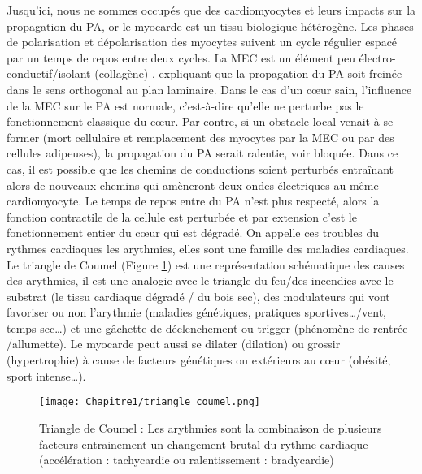 \clearpage

Jusqu’ici, nous ne sommes occupés que des cardiomyocytes et leurs impacts sur la propagation du PA, or le myocarde est un tissu biologique hétérogène. Les phases de polarisation et dépolarisation des myocytes suivent un cycle régulier espacé par un temps de repos entre deux cycles. La MEC est un élément peu électro-conductif/isolant (collagène) \cite{Zannad2005}, expliquant que la propagation du PA soit freinée dans le sens orthogonal au plan laminaire. Dans le cas d’un cœur sain, l’influence de la MEC sur le PA est normale, c’est-à-dire qu’elle ne perturbe pas le fonctionnement classique du cœur. Par contre, si un obstacle local venait à se former (mort cellulaire et remplacement des myocytes par la MEC ou par des cellules adipeuses), la propagation du PA serait ralentie, voir bloquée. Dans ce cas, il est possible que les chemins de conductions soient perturbés entraînant alors de nouveaux chemins qui amèneront deux ondes électriques au même cardiomyocyte. Le temps de repos entre du PA n’est plus respecté, alors la fonction contractile de la cellule est perturbée et par extension c’est le fonctionnement entier du cœur qui est dégradé. On appelle ces troubles du rythmes cardiaques les arythmies, elles sont une famille des maladies cardiaques. \\

Le triangle de Coumel (Figure \ref{fig:fig_coumel}) est une représentation schématique des causes des arythmies, il est une analogie avec le triangle du feu/des incendies avec le substrat (le tissu cardiaque dégradé / du bois sec), des modulateurs qui vont favoriser ou non l’arythmie (maladies génétiques, pratiques sportives…/vent, temps sec…) et une gâchette de déclenchement ou trigger (phénomène de rentrée /allumette). Le myocarde peut aussi se dilater (dilation) ou grossir (hypertrophie) à cause de facteurs génétiques ou extérieurs au cœur (obésité, sport intense…). 

\begin{figure}[!htbp]
  \begin{center}
    \texttt{[image: Chapitre1/triangle\_coumel.png]}
     \end{center}
    \caption{Triangle de Coumel : Les arythmies sont la combinaison de plusieurs facteurs entrainement un changement brutal du rythme cardiaque (accélération : tachycardie ou ralentissement : bradycardie)}
  \label{fig:fig_coumel}
\end{figure}


